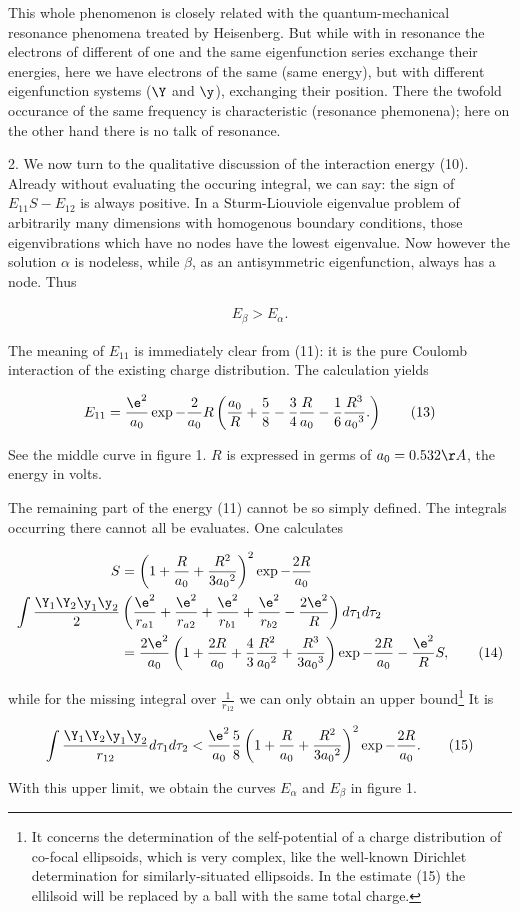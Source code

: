 \documentclass{article}
\newcommand{\nequ}[2]{
\begin{align*}
#1
\tag{#2}
\end{align*}
}
\begin{document}
This whole phenomenon is closely related with the quantum-mechanical resonance phenomena treated by Heisenberg. But while with in resonance the electrons of different  of one and the same eigenfunction series exchange their energies, here we have electrons of the same  (same energy), but with different eigenfunction systems ($\Y$ and $\y$), exchanging their position. There the twofold occurance of the same frequency is characteristic (resonance phemonena); here on the other hand there is no talk of resonance.

2. We now turn to the qualitative discussion of the interaction energy (10). Already without evaluating the occuring integral, we can say: the sign of $E_{11}S - E_{12}$ is always positive. In a Sturm-Liouviole eigenvalue problem of arbitrarily many dimensions with homogenous boundary conditions, those eigenvibrations which have no nodes have the lowest eigenvalue. Now however the solution $\alpha$ is nodeless, while $\beta$, as an antisymmetric eigenfunction, always has a node. Thus
\nequ{
E_\beta > E_\alpha.
}{12}

The meaning of $E_{11}$ is immediately clear from (11): it is the pure Coulomb interaction of the existing charge distribution. The calculation yields
\nequ{
E_{11} = \frac{\e^2}{a_0}\exp{-\frac{2}{a_0}R}\left(
\frac{a_0}{R} + \frac{5}{8} - \frac{3}{4}\frac{R}{a_0} - \frac{1}{6}\frac{R^3}{{a_0}^3}.
\right)
}{13}
See the middle curve in figure 1. $R$ is expressed in germs of $a_0 = 0.532\AA$, the energy in volts.

The remaining part of the energy (11) cannot be so simply defined. The integrals occurring there cannot all be evaluates. One calculates
\nequ{
S &= \left(1 + \frac{R}{a_0} + \frac{R^2}{3{a_0}^2}\right)^2 \exp{-\frac{2R}{a_0}}\\
\int\frac{\Y_1\Y_2\y_1\y_2}{2} & \left(
\frac{\e^2}{r_{a1}} + \frac{\e^2}{r_{a2}} + \frac{\e^2}{r_{b1}} + \frac{\e^2}{r_{b2}} - \frac{2\e^2}{R}
\right)d\tau_1 d\tau_2\\
&= \frac{2\e^2}{a_0}\left(1 + \frac{2R}{a_0} + \frac{4}{3}\frac{R^2}{{a_0}^2} + \frac{R^3}{3{a_0}^3}\right)\exp{-\frac{2R}{a_0}} - \frac{\e^2}{R}S,
}{14}
while for the missing integral over $\frac{1}{r_{12}}$ we can only obtain an upper bound\footnote{It concerns the determination of the self-potential of a charge distribution of co-focal ellipsoids, which is very complex, like the well-known Dirichlet determination for similarly-situated ellipsoids. In the estimate (15) the ellilsoid will be replaced by a ball with the same total charge.} It is
\nequ{
\int\frac{\Y_1\Y_2\y_1\y_2}{r_{12}}d\tau_1 d\tau_2 <
\frac{\e^2}{a_0}\frac{5}{8}\left(1 + \frac{R}{a_0} + \frac{R^2}{3{a_0}^2}\right)^2 \exp{-\frac{2R}{a_0}}.
}{15}
With this upper limit, we obtain the curves $E_\alpha$ and $E_\beta$ in figure 1.
\end{document}
